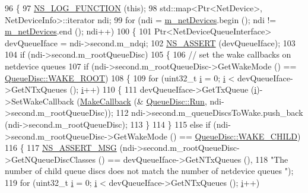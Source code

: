 \begin{DoxyCode}
96 \{
97   \hyperlink{log-macros-disabled_8h_a90b90d5bad1f39cb1b64923ea94c0761}{NS\_LOG\_FUNCTION} (\textcolor{keyword}{this});
98   std::map<Ptr<NetDevice>, NetDeviceInfo>::iterator ndi;
99   \textcolor{keywordflow}{for} (ndi = \hyperlink{classns3_1_1TrafficControlLayer_a78320d2a2610f730984ca796ed51a495}{m\_netDevices}.begin (); ndi != \hyperlink{classns3_1_1TrafficControlLayer_a78320d2a2610f730984ca796ed51a495}{m\_netDevices}.end (); ndi++)
100     \{
101       Ptr<NetDeviceQueueInterface> devQueueIface = ndi->second.m\_ndqi;
102       \hyperlink{assert_8h_a6dccdb0de9b252f60088ce281c49d052}{NS\_ASSERT} (devQueueIface);
103 
104       \textcolor{keywordflow}{if} (ndi->second.m\_rootQueueDisc)
105         \{
106           \textcolor{comment}{// set the wake callbacks on netdevice queues}
107            \textcolor{keywordflow}{if} (ndi->second.m\_rootQueueDisc->GetWakeMode () == 
      \hyperlink{classns3_1_1QueueDisc_a0b9b32e71d5becf66e6ac4b3d3de7c8ba56fb0e52526a39cefb47d24550bf47c6}{QueueDisc::WAKE\_ROOT})
108             \{
109               \textcolor{keywordflow}{for} (uint32\_t \hyperlink{bernuolliDistribution_8m_a6f6ccfcf58b31cb6412107d9d5281426}{i} = 0; \hyperlink{bernuolliDistribution_8m_a6f6ccfcf58b31cb6412107d9d5281426}{i} < devQueueIface->GetNTxQueues (); \hyperlink{bernuolliDistribution_8m_a6f6ccfcf58b31cb6412107d9d5281426}{i}++)
110                 \{
111                   devQueueIface->GetTxQueue (\hyperlink{bernuolliDistribution_8m_a6f6ccfcf58b31cb6412107d9d5281426}{i})->SetWakeCallback (\hyperlink{group__makecallbackmemptr_ga9376283685aa99d204048d6a4b7610a4}{MakeCallback} (&
      \hyperlink{classns3_1_1QueueDisc_a424eceba41cb013436f353c622c082ff}{QueueDisc::Run}, ndi->second.m\_rootQueueDisc));
112                   ndi->second.m\_queueDiscsToWake.push\_back (ndi->second.m\_rootQueueDisc);
113                 \}
114             \}
115           \textcolor{keywordflow}{else} \textcolor{keywordflow}{if} (ndi->second.m\_rootQueueDisc->GetWakeMode () == 
      \hyperlink{classns3_1_1QueueDisc_a0b9b32e71d5becf66e6ac4b3d3de7c8bad2dbf3b0b56e3e0d4d0f8f944c4d0fcd}{QueueDisc::WAKE\_CHILD})
116             \{
117               \hyperlink{assert_8h_aff5ece9066c74e681e74999856f08539}{NS\_ASSERT\_MSG} (ndi->second.m\_rootQueueDisc->GetNQueueDiscClasses () == 
      devQueueIface->GetNTxQueues (),
118                              \textcolor{stringliteral}{"The number of child queue discs does not match the number of netdevice queues
      "});
119               \textcolor{keywordflow}{for} (uint32\_t \hyperlink{bernuolliDistribution_8m_a6f6ccfcf58b31cb6412107d9d5281426}{i} = 0; \hyperlink{bernuolliDistribution_8m_a6f6ccfcf58b31cb6412107d9d5281426}{i} < devQueueIface->GetNTxQueues (); \hyperlink{bernuolliDistribution_8m_a6f6ccfcf58b31cb6412107d9d5281426}{i}++)

\end{DoxyCode}
